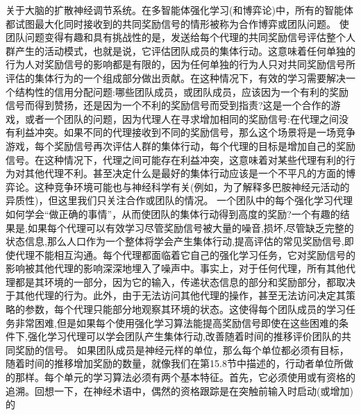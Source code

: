 关于大脑的扩散神经调节系统。在多智能体强化学习(和博弈论)中，所有的智能体都试图最大化同时接收到的共同奖励信号的情形被称为合作博弈或团队问题。
使团队问题变得有趣和具有挑战性的是，发送给每个代理的共同奖励信号评估整个人群产生的活动模式，也就是说，它评估团队成员的集体行动。这意味着任何单独的行为人对奖励信号的影响都是有限的，因为任何单独的行为人只对共同奖励信号所评估的集体行为的一个组成部分做出贡献。在这种情况下，有效的学习需要解决一个结构性的信用分配问题:哪些团队成员，或团队成员，应该因为一个有利的奖励信号而得到赞扬，还是因为一个不利的奖励信号而受到指责?这是一个合作的游戏，或者一个团队的问题，因为代理人在寻求增加相同的奖励信号:在代理之间没有利益冲突。如果不同的代理接收到不同的奖励信号，那么这个场景将是一场竞争游戏，每个奖励信号再次评估人群的集体行动，每个代理的目标是增加自己的奖励信号。在这种情况下，代理之间可能存在利益冲突，这意味着对某些代理有利的行为对其他代理不利。甚至决定什么是最好的集体行动应该是一个不平凡的方面的博弈论。这种竞争环境可能也与神经科学有关(例如，为了解释多巴胺神经元活动的异质性)，但这里我们只关注合作或团队的情况。
一个团队中的每个强化学习代理如何学会“做正确的事情”，从而使团队的集体行动得到高度的奖励?一个有趣的结果是,如果每个代理可以有效学习尽管奖励信号被大量的噪音,损坏,尽管缺乏完整的状态信息,那么人口作为一个整体将学会产生集体行动,提高评估的常见奖励信号,即使代理不能相互沟通。每个代理都面临着它自己的强化学习任务，它对奖励信号的影响被其他代理的影响深深地埋入了噪声中。事实上，对于任何代理，所有其他代理都是其环境的一部分，因为它的输入，传递状态信息的部分和奖励部分，都取决于其他代理的行为。此外，由于无法访问其他代理的操作，甚至无法访问决定其策略的参数，每个代理只能部分地观察其环境的状态。这使得每个团队成员的学习任务非常困难,但是如果每个使用强化学习算法能提高奖励信号即使在这些困难的条件下,强化学习代理可以学会团队产生集体行动,改善随着时间的推移评价团队的共同奖励的信号。
如果团队成员是神经元样的单位，那么每个单位都必须有目标，随着时间的推移增加奖励的数量，就像我们在第15.8节中描述的，行动者单位所做的那样。每个单元的学习算法必须有两个基本特征。首先，它必须使用或有资格的追溯。回想一下，在神经术语中，偶然的资格跟踪是在突触前输入时启动(或增加)的

